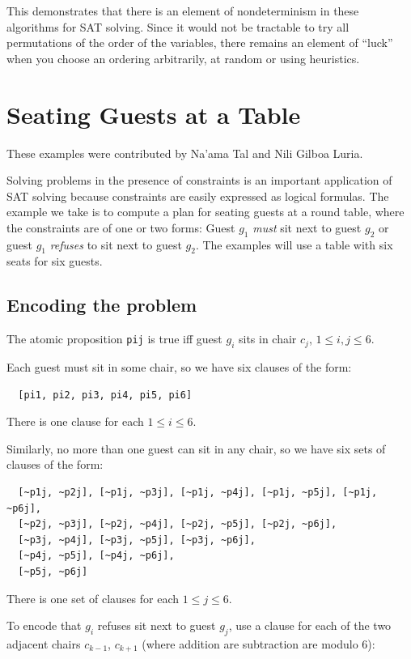 \documentclass[11pt]{report}
\newcommand*{\p}[1]{\textup{\texttt{#1}}}
\begin{document}
This demonstrates that there is an element of nondeterminism in these
algorithms for SAT solving. Since it would not be tractable to try all
permutations of the order of the variables, there remains an element of
``luck'' when you choose an ordering arbitrarily, at random or using
 heuristics.


\chapter{Seating Guests at a Table}

\begin{center}
These examples were contributed by Na'ama Tal and Nili Gilboa Luria.
\end{center}

Solving problems in the presence of constraints is an important
application of SAT solving because constraints are easily expressed as
logical formulas. The example we take is to compute a plan for seating
guests at a round table, where the constraints are of one or two forms:
Guest $g_1$ \emph{must} sit next to guest $g_2$ or guest $g_1$
\emph{refuses} to sit next to guest $g_2$. The examples will use a table
with six seats for six guests.

\section{Encoding the problem}

The atomic proposition \p{pij} is true iff guest $g_i$ sits in chair
$c_j$, $1 \leq i,j \leq 6$.

Each guest must sit in some chair, so we have six clauses of the form:
\begin{verbatim}
  [pi1, pi2, pi3, pi4, pi5, pi6]
\end{verbatim}
There is one clause for each $1 \leq i \leq 6$.

Similarly, no more than one guest can sit in any chair, so we have six
sets of clauses of the form:
\begin{verbatim}
  [~p1j, ~p2j], [~p1j, ~p3j], [~p1j, ~p4j], [~p1j, ~p5j], [~p1j, ~p6j], 
  [~p2j, ~p3j], [~p2j, ~p4j], [~p2j, ~p5j], [~p2j, ~p6j],  
  [~p3j, ~p4j], [~p3j, ~p5j], [~p3j, ~p6j], 
  [~p4j, ~p5j], [~p4j, ~p6j], 
  [~p5j, ~p6j]
\end{verbatim}
There is one set of clauses for each $1 \leq j \leq 6$.
 
To encode that $g_i$ refuses sit next to guest $g_j$, use a clause for
each of the two adjacent chairs $c_{k-1}$, $c_{k+1}$ (where addition are
subtraction are modulo 6):
\end{document}

